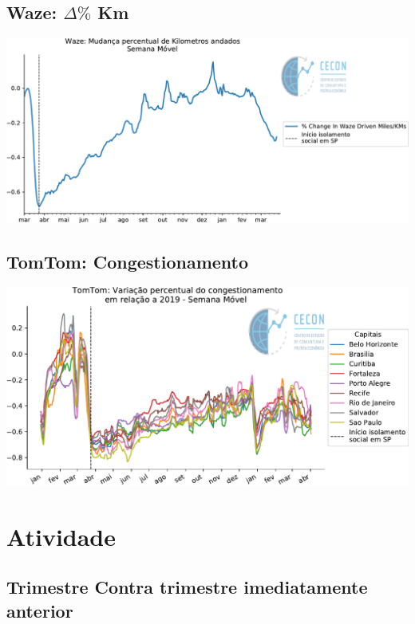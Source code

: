 \documentclass{SelfArx}
\begin{document}
\subsection*{Waze: \(\Delta \%\) Km}
\label{sec:orga4ed98d}

\begin{center}
\includegraphics[width=.9\linewidth]{./figs/Granulares/Waze_Brasil.pdf}
\end{center}

\subsection*{TomTom: Congestionamento}
\label{sec:org2568703}

\begin{center}
\includegraphics[width=.9\linewidth]{./figs/Granulares/TomTom_Brasil.pdf}
\end{center}

\section*{Atividade}
\label{sec:org975c4ec}



\subsection*{Trimestre Contra trimestre imediatamente anterior}
\label{sec:orgc26d4a2}
\end{document}
